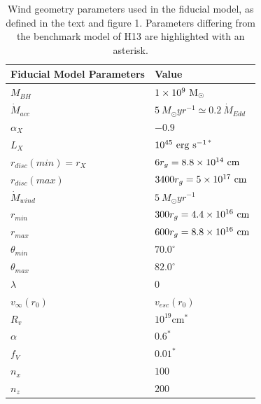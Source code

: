 \documentclass[useAMS,usenatbib]{mn2e_x}
\begin{document}
\begin{table}
\begin{tabular}{p{3cm}p{4cm}}
\hline Fiducial Model Parameters 	&	 Value \\ 
\hline \hline 
$M_{BH}$ 	 &	 $1\times 10^9~\rm{M_{\odot}}$ \\ 
$\dot{M}_{acc}$ 	 &	 $5~M_{\odot}yr^{-1} \simeq 0.2~\dot{M}_{Edd}$\\ 
$\alpha_X$ 	 &	 $-0.9$ \\ 
$L_{X} $ 	 &	 $10^{45}~\rm{erg~s^{-1}}$$^*$ \\ 
$r_{disc}(min)=r_{X}$   &	 $6r_g=8.8\times10^{14}~{\rm cm}$ \\ 
$r_{disc}(max)$   &	 $3400r_g = 5\times10^{17}~{\rm cm}$ \\ 
$\dot{M}_{wind}$  &	 $5~M_{\odot}yr^{-1}$ \\ 
$r_{min}$ 	&	 $300r_{g} = 4.4\times10^{16}~{\rm cm}$\\ 
$r_{max}$ 	&	 $600r_{g} = 8.8\times10^{16}~{\rm cm}$ \\ 
$\theta_{min}$ 	&	 $70.0^{\circ}$ \\ 
$\theta_{max}$ 	&	 $82.0^{\circ}$ \\ 
$\lambda$ 	&	 $0$ \\ 
$v_{\infty}(r_0)$ 	&	 $v_{esc}(r_0)$ \\ 
$R_v$  	        &	 $10^{19}$cm$^*$ \\ 
$\alpha$ 	&	 $0.6^*$ \\
$f_V$ 	&	 $0.01^*$  \\
$n_x$ 	&	 $100$  \\
$n_z$ 	&	 $200$  \\
\hline 
\end{tabular}
\caption{Wind geometry parameters 
used in the fiducial model, as defined in the text and figure 1.
Parameters differing from the benchmark model of H13 are 
highlighted with an asterisk.}
\label{wind_param}
\end{table}
\end{document}
